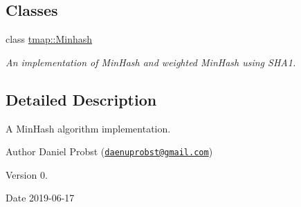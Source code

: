 \subsection*{Classes}
\begin{DoxyCompactItemize}
\item 
class \hyperlink{classtmap_1_1Minhash}{tmap\+::\+Minhash}
\begin{DoxyCompactList}\small\item\em An implementation of Min\+Hash and weighted Min\+Hash using S\+H\+A1. \end{DoxyCompactList}\end{DoxyCompactItemize}


\subsection{Detailed Description}
A Min\+Hash algorithm implementation. 

\begin{DoxyAuthor}{Author}
Daniel Probst (\href{mailto:daenuprobst@gmail.com}{\tt daenuprobst@gmail.\+com}) 
\end{DoxyAuthor}
\begin{DoxyVersion}{Version}
0. 
\end{DoxyVersion}
\begin{DoxyDate}{Date}
2019-\/06-\/17 
\end{DoxyDate}
